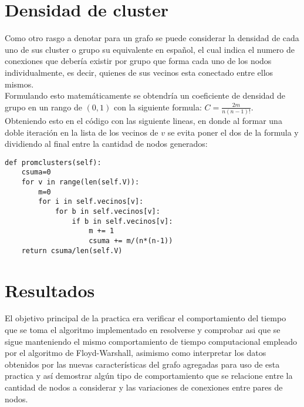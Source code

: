 \documentclass[12pt]{article}
\begin{document}
\section{Densidad de cluster}
Como otro rasgo a denotar para un grafo se puede considerar la densidad de cada uno de sus cluster o grupo su equivalente en español, el cual indica el numero de conexiones que debería existir por grupo que forma cada uno de los nodos individualmente, es decir, quienes de sus vecinos esta conectado entre ellos mismos.\\
Formulando esto matemáticamente se obtendría un coeficiente de densidad de grupo en un rango de $(0,1)$ con la siguiente formula: $C=\frac{2m}{n(n-1)!}$.\\ Obteniendo esto en el código con las siguiente lineas, en donde al formar una doble iteración en la lista de los vecinos de $v$ se evita poner el dos de la formula y dividiendo al final entre la cantidad de nodos generados:
\begin{lstlisting}[style=tt]
def promclusters(self):
	csuma=0
	for v in range(len(self.V)):
		m=0
		for i in self.vecinos[v]:
			for b in self.vecinos[v]:
				if b in self.vecinos[v]:
					m += 1
					csuma += m/(n*(n-1))
	return csuma/len(self.V)
\end{lstlisting}
\section{Resultados}
El objetivo principal de la practica era verificar el comportamiento del tiempo que se toma el algoritmo implementado en resolverse y comprobar asi que se sigue manteniendo el mismo comportamiento de tiempo computacional empleado por el algoritmo de Floyd-Warshall, asimismo como interpretar los datos obtenidos por las nuevas características del grafo agregadas para uso de esta practica y así demostrar algún tipo de comportamiento que se relacione entre la cantidad de nodos a considerar y las variaciones de conexiones entre pares de nodos.\\
\end{document}
